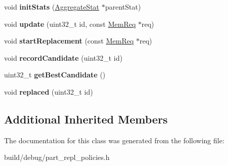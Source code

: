 \begin{DoxyCompactItemize}
\item 
\hypertarget{classWayPartReplPolicy_a63b0823126e72f0ec951dde90c1a9977}{void {\bfseries init\-Stats} (\hyperlink{classAggregateStat}{Aggregate\-Stat} $\ast$parent\-Stat)}\label{classWayPartReplPolicy_a63b0823126e72f0ec951dde90c1a9977}

\item 
\hypertarget{classWayPartReplPolicy_a9372672c88cf0e53f9218836d760c8ff}{void {\bfseries update} (uint32\-\_\-t id, const \hyperlink{structMemReq}{Mem\-Req} $\ast$req)}\label{classWayPartReplPolicy_a9372672c88cf0e53f9218836d760c8ff}

\item 
\hypertarget{classWayPartReplPolicy_af2660add95f97c3e65e2e427c3c9c9fd}{void {\bfseries start\-Replacement} (const \hyperlink{structMemReq}{Mem\-Req} $\ast$req)}\label{classWayPartReplPolicy_af2660add95f97c3e65e2e427c3c9c9fd}

\item 
\hypertarget{classWayPartReplPolicy_a133e827b256bdd9485703968ebc6764e}{void {\bfseries record\-Candidate} (uint32\-\_\-t id)}\label{classWayPartReplPolicy_a133e827b256bdd9485703968ebc6764e}

\item 
\hypertarget{classWayPartReplPolicy_a1bc5d275de4abd8c9a91bcffefdab304}{uint32\-\_\-t {\bfseries get\-Best\-Candidate} ()}\label{classWayPartReplPolicy_a1bc5d275de4abd8c9a91bcffefdab304}

\item 
\hypertarget{classWayPartReplPolicy_ac1fd3a50f831294f63deebf5c078b98b}{void {\bfseries replaced} (uint32\-\_\-t id)}\label{classWayPartReplPolicy_ac1fd3a50f831294f63deebf5c078b98b}

\end{DoxyCompactItemize}
\subsection*{Additional Inherited Members}


The documentation for this class was generated from the following file\-:\begin{DoxyCompactItemize}
\item 
build/debug/part\-\_\-repl\-\_\-policies.\-h\end{DoxyCompactItemize}
